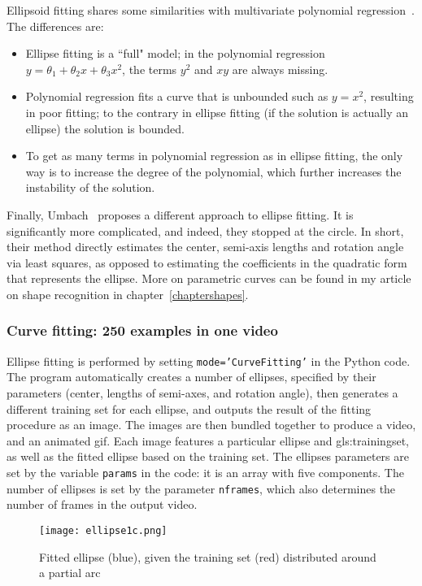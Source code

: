\documentclass[oneside,10pt]{book}
\begin{document}
\noindent Ellipsoid fitting shares some similarities with multivariate polynomial regression~\cite{vaccari2007}.  The differences are: 
\begin{itemize}
\item Ellipse fitting is a ``full" model;  in the polynomial regression $y=\theta_1+\theta_2 x + \theta_3 x^2$, the terms $y^2$ and $xy$ are always missing.
\item Polynomial regression fits a curve that is unbounded such as $y=x^2$, resulting in poor fitting; to the contrary in ellipse fitting (if the solution is actually an ellipse) the solution is bounded.
 \item To get as many terms in polynomial regression as in ellipse fitting, the only way is to increase the degree of the polynomial, which further increases the instability of the solution.
\end{itemize}  

\noindent Finally, Umbach~\cite{ieee200y} proposes a different approach to ellipse fitting. It is significantly more complicated, and indeed, they stopped at the circle. In short, their method directly estimates the center, semi-axis lengths and rotation angle via least squares, as opposed to estimating the coefficients in the quadratic form that represents the ellipse. More on parametric curves can be found in my article on shape recognition in chapter~\ref{chaptershapes}. 

\subsubsection{Curve fitting: 250 examples in one video}

Ellipse fitting is performed by setting \texttt{mode='CurveFitting'} in the Python code. The program automatically creates a number of ellipses, specified by their parameters (center, lengths of semi-axes, and rotation angle), then generates a different training set for each ellipse, and outputs the result of the fitting procedure as an image. The images are then bundled together to produce a video, and an animated gif. Each image features a particular 
 ellipse and \gls{gls:trainingset}, as well as the fitted ellipse based on the training set. The ellipses parameters are set by the variable \texttt{params} in the code: it is an array with five components. The number of ellipses is set by the parameter \texttt{nframes}, which also determines the number of frames in the output video.

\begin{figure}%
\centering
\texttt{[image: ellipse1c.png]}  
\caption{Fitted ellipse (blue), given the training set (red) distributed around a partial arc}
\label{fig:ellipse11b}
\end{figure}
\end{document}
